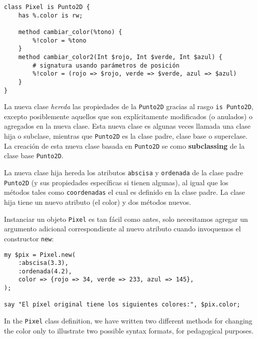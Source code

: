 \begin{verbatim}
class Pixel is Punto2D {
    has %.color is rw;

    method cambiar_color(%tono) {
        %!color = %tono
    }
    method cambiar_color2(Int $rojo, Int $verde, Int $azul) {
        # signatura usando parámetros de posición
        %!color = (rojo => $rojo, verde => $verde, azul => $azul)
    }
}
\end{verbatim}

La nueva clase \emph{hereda} las propiedades de la {\tt Punto2D}
gracias al rasgo {\tt is Punto2D}, excepto posiblemente
aquellos que son explícitamente modificados (o anulados) o agregados
en la nueva clase. Esta nueva clase es algunas veces llamada
una clase hija o subclase, mientras que {\tt Punto2D} es la
clase padre, clase base o superclase. La creación de esta nueva
clase basada en {\tt Punto2D} se como {\bf subclassing} de la 
clase base {\tt Punto2D}.

La nueva clase hija hereda los atributos {\tt abscisa} y 
{\tt ordenada} de la clase padre {\tt Punto2D} (y sus 
propiedades específicas si tienen algunas), al igual que los
métodos tales como {\tt coordenadas} el cual es definido en
la clase padre. La clase hija tiene un nuevo atributo (el color)
y dos métodos nuevos.

Instanciar un objeto {\tt Pixel} es tan fácil como antes,
solo necesitamos agregar un argumento adicional correspondiente
al nuevo atributo cuando invoquemos el constructor {\tt new}:
\begin{verbatim}
my $pix = Pixel.new(
	:abscisa(3.3),
	:ordenada(4.2),
	color => {rojo => 34, verde => 233, azul => 145}, 
);

say "El píxel original tiene los siguientes colores:", $pix.color;
\end{verbatim}

In the {\tt Pixel} class definition, we have written 
two different methods for changing the color 
only to illustrate two possible syntax formats, for pedagogical 
purposes.

